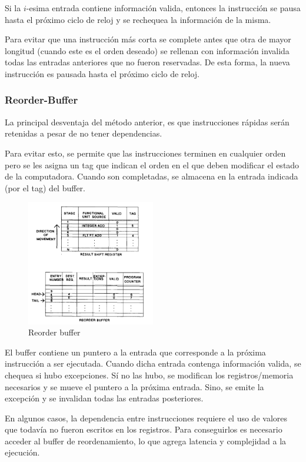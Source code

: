 Si la $i$-esima entrada contiene información valida, entonces la instrucción se pausa hasta el próximo ciclo de reloj y se rechequea la información de la misma.

Para evitar que una instrucción más corta se complete antes que otra de mayor longitud (cuando este es el orden deseado) se rellenan con información invalida todas las entradas anteriores que no fueron reservadas. De esta forma, la nueva instrucción es pausada hasta el próximo ciclo de reloj.

\subsubsection{Reorder-Buffer}
La principal desventaja del método anterior, es que instrucciones rápidas serán retenidas a pesar de no tener dependencias.

Para evitar esto, se permite que las instrucciones terminen en cualquier orden pero se les asigna un tag que indican el orden en el que deben modificar el estado de la computadora. Cuando son completadas, se almacena en la entrada indicada (por el tag) del buffer.

\begin{figure}[h]
	\centering
	\includegraphics[width=0.5\textwidth]{imagenes/reorder-buffer}
	\caption{Reorder buffer}
	\label{fig:reorder-buffer}
\end{figure}

El buffer contiene un puntero a la entrada que corresponde a la próxima instrucción a ser ejecutada. Cuando dicha entrada contenga información valida, se  chequea si hubo excepciones. Sí no las hubo, se modifican los registros/memoria necesarios y se mueve el puntero a la próxima entrada. Sino, se emite la excepción y se invalidan todas las entradas posteriores.

En algunos casos, la dependencia entre instrucciones requiere el uso de valores que todavía no fueron escritos en los registros. Para conseguirlos es necesario acceder al buffer de reordenamiento, lo que agrega latencia y complejidad a la ejecución.

